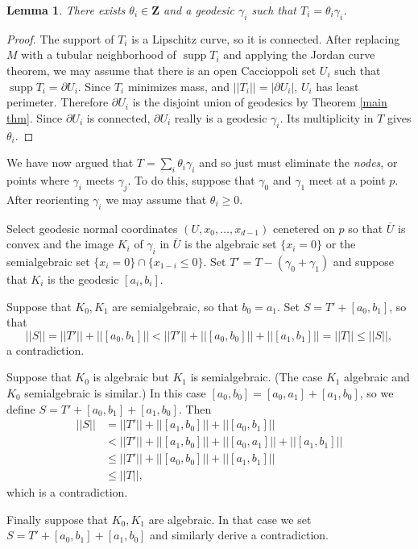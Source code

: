 \documentclass[reqno,12pt,letterpaper]{amsart}
\newcommand{\ZZ}{\mathbf{Z}}
\DeclareMathOperator{\supp}{supp}
\newcommand{\dfn}[1]{\emph{#1}\index{#1}}
\newtheorem{lemma}[theorem]{Lemma}
\theoremstyle{definition}
\numberwithin{equation}{section}
\begin{document}
\begin{lemma}
There exists $\theta_i \in \ZZ$ and a geodesic $\gamma_i$ such that $T_i = \theta_i \gamma_i$.
\end{lemma}
\begin{proof}
The support of $T_i$ is a Lipschitz curve, so it is connected.
After replacing $M$ with a tubular neighborhood of $\supp T_i$ and applying the Jordan curve theorem, we may assume that there is an open Caccioppoli set $U_i$ such that $\supp T_i = \partial U_i$.
Since $T_i$ minimizes mass, and $||T_i|| = |\partial U_i|$, $U_i$ has least perimeter.
Therefore $\partial U_i$ is the disjoint union of geodesics by Theorem \ref{main thm}.
Since $\partial U_i$ is connected, $\partial U_i$ really is a geodesic $\gamma_i$.
Its multiplicity in $T$ gives $\theta_i$.
\end{proof}

We have now argued that $T = \sum_i \theta_i \gamma_i$ and so just must eliminate the \dfn{nodes}, or points where $\gamma_i$ meets $\gamma_j$.
To do this, suppose that $\gamma_0$ and $\gamma_1$ meet at a point $p$.
After reorienting $\gamma_i$ we may assume that $\theta_i \geq 0$.

Select geodesic normal coordinates $(U, x_0, \dots, x_{d-1})$ cenetered on $p$ so that $\overline U$ is convex and the image $K_i$ of $\gamma_i$ in $\overline U$ is the algebraic set $\{x_i = 0\}$ or the semialgebraic set $\{x_i = 0\} \cap \{x_{1 - i} \leq 0\}$.
Set $T' = T - (\gamma_0 + \gamma_1)$ and suppose that $K_i$ is the geodesic $[a_i, b_i]$.

Suppose that $K_0,K_1$ are semialgebraic, so that $b_0 = a_1$. Set $S = T' + [a_0, b_1]$, so that
$$||S|| = ||T'|| + ||[a_0, b_1]|| < ||T'|| + ||[a_0, b_0]|| + ||[a_1, b_1]|| = ||T|| \leq ||S||,$$
a contradiction.

Suppose that $K_0$ is algebraic but $K_1$ is semialgebraic. (The case $K_1$ algebraic and $K_0$ semialgebraic is similar.)
In this case $[a_0, b_0] = [a_0, a_1] + [a_1, b_0]$, so we define $S = T' + [a_0, b_1] + [a_1, b_0]$.
Then
\begin{align*}
||S|| &= ||T'|| + ||[a_1, b_0]|| + ||[a_0, b_1]|| \\
&< ||T'|| + ||[a_1, b_0]|| + ||[a_0, a_1]|| + ||[a_1, b_1]|| \\
&\leq ||T'|| + ||[a_0, b_0]|| + ||[a_1, b_1]|| \\
&\leq ||T||,
\end{align*}
which is a contradiction.

Finally suppose that $K_0,K_1$ are algebraic.
In that case we set $S = T' + [a_0, b_1] + [a_1, b_0]$ and similarly derive a contradiction.
\end{document}
